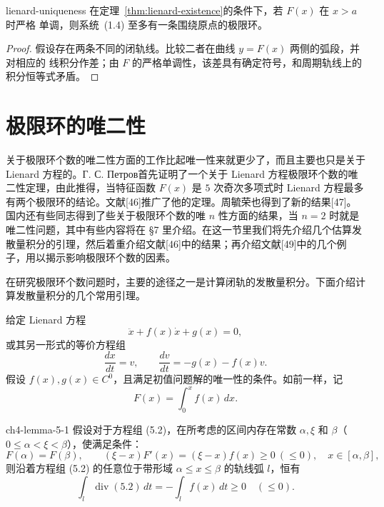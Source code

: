 \begin{theorem}{}{lienard-uniqueness}
在定理~\ref{thm:lienard-existence}的条件下，若 $F(x)$ 在 $x>a$ 时严格
单调，则系统~(1.4) 至多有一条围绕原点的极限环。
\end{theorem}

\begin{proof}
假设存在两条不同的闭轨线。比较二者在曲线 $y=F(x)$ 两侧的弧段，并对相应的
线积分作差；由 $F$ 的严格单调性，该差具有确定符号，和周期轨线上的积分恒等式矛盾。
\end{proof}


\fi

\section{极限环的唯二性}

关于极限环个数的唯二性方面的工作比起唯一性来就更少了，而且主要也只是关于 Lienard 方程的。Г. С. Петров首先证明了一个关于 Lienard 方程极限环个数的唯二性定理，由此推得，当特征函数 $F(x)$ 是 $5$ 次奇次多项式时 Lienard 方程最多有两个极限环的结论。文献[46]推广了他的定理。周毓荣也得到了新的结果[47]。国内还有些同志得到了些关于极限环个数的唯 $n$ 性方面的结果，当 $n=2$ 时就是唯二性问题，其中有些内容将在 \S7 里介绍。在这一节里我们将先介绍几个估算发散量积分的引理，然后着重介绍文献[46]中的结果；再介绍文献[49]中的几个例子，用以揭示影响极限环个数的因素。

在研究极限环个数问题时，主要的途径之一是计算闭轨的发散量积分。下面介绍计算发散量积分的几个常用引理。

给定 Lienard 方程
\begin{equation}
\ddot{x}+f(x)\dot{x}+g(x)=0,\tag{5.1}
\end{equation}
或其另一形式的等价方程组
\begin{equation}
\dfrac{dx}{dt}=v,\qquad \dfrac{dv}{dt}=-g(x)-f(x)v.\tag{5.2}
\end{equation}
假设 $f(x),g(x)\in C^0$，且满足初值问题解的唯一性的条件。如前一样，记
\[
F(x)=\int_0^x f(x)\,dx.
\]

\begin{lemma}{ }{ch4-lemma-5-1}
假设对于方程组 (5.2)，在所考虑的区间内存在常数 $\alpha,\xi$ 和 $\beta$（$0\leqslant\alpha<\xi<\beta$），使满足条件：
\[
F(\alpha)=F(\beta),\qquad (\xi-x)F'(x)=(\xi-x)f(x)\geqslant0\ (\leqslant0),\quad x\in[\alpha,\beta],
\]
则沿着方程组 (5.2) 的任意位于带形域 $\alpha\leqslant x\leqslant\beta$ 的轨线弧 $l$，恒有
\begin{equation}
\int_l\operatorname{div}(5.2)\,dt=-\int_lf(x)\,dt\geqslant0\quad(\leqslant0).
\tag{5.3}
\end{equation}
\end{lemma}

